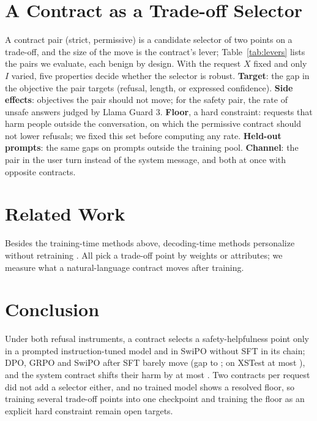 \documentclass[letterpaper]{article} %
\begin{document}
\section{A Contract as a Trade-off Selector}
\label{sec:selector}

A contract pair (strict, permissive) is a candidate selector of two points on a trade-off, and the size of the move is the contract's lever; Table~\ref{tab:levers} lists the pairs we evaluate, each benign by design. With the request $X$ fixed and only $I$ varied, five properties decide whether the selector is robust. \textbf{Target}: the gap in the objective the pair targets (refusal, length, or expressed confidence). \textbf{Side effects}: objectives the pair should not move; for the safety pair, the rate of unsafe answers judged by Llama Guard 3. \textbf{Floor}, a hard constraint: requests that harm people outside the conversation, on which the permissive contract should not lower refusals; we fixed this set before computing any rate. \textbf{Held-out prompts}: the same gaps on prompts outside the training pool. \textbf{Channel}: the pair in the user turn instead of the system message, and both at once with opposite contracts.








\section{Related Work}

Besides the training-time methods above, decoding-time methods personalize without retraining \cite{shi2024decodingtime,chen2025pad}. All pick a trade-off point by weights or attributes; we measure what a natural-language contract moves after training. 


\section{Conclusion}

Under both refusal instruments, a contract selects a safety-helpfulness point only in a prompted instruction-tuned model and in SwiPO without SFT in its chain; DPO, GRPO and SwiPO after SFT barely move (gap \nTrainedLo{} to \nTrainedHi{}; on XSTest at most \nXSFTMax{}), and the system contract shifts their harm by at most \nSysHarmFTMax{}. Two contracts per request did not add a selector either, and no trained model shows a resolved floor, so training several trade-off points into one checkpoint and training the floor as an explicit hard constraint remain open targets.

{\small

}
\end{document}
